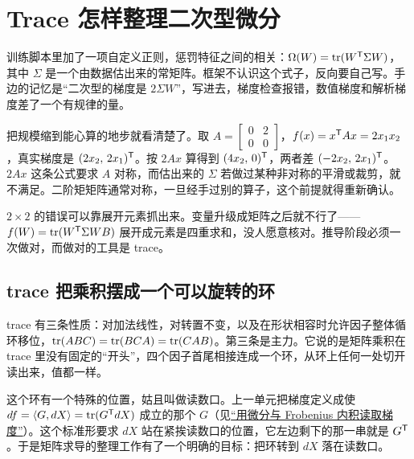 \section{Trace 怎样整理二次型微分}
\label{sec:10-Matrix-Calculus/03-Trace-Calculus/01}

训练脚本里加了一项自定义正则，惩罚特征之间的相关：\(\Omega(W)=\operatorname{tr}(W^{\mathsf{T}}\Sigma W)\)，其中 \(\Sigma\) 是一个由数据估出来的常矩阵。框架不认识这个式子，反向要自己写。手边的记忆是``二次型的梯度是 \(2\Sigma W\)''，写进去，梯度检查报错，数值梯度和解析梯度差了一个有规律的量。

把规模缩到能心算的地步就看清楚了。取 \(A=\begin{bmatrix}0&2\\0&0\end{bmatrix}\)，\(f(x)=x^{\mathsf{T}}Ax=2x_1x_2\)，真实梯度是 \((2x_2,\,2x_1)^{\mathsf{T}}\)。按 \(2Ax\) 算得到 \((4x_2,\,0)^{\mathsf{T}}\)，两者差 \((-2x_2,\,2x_1)^{\mathsf{T}}\)。\(2Ax\) 这条公式要求 \(A\) 对称，而估出来的 \(\Sigma\) 若做过某种非对称的平滑或裁剪，就不满足。二阶矩矩阵通常对称，一旦经手过别的算子，这个前提就得重新确认。

\(2\times2\) 的错误可以靠展开元素抓出来。变量升级成矩阵之后就不行了——\(f(W)=\operatorname{tr}(W^{\mathsf{T}}\Sigma W B)\) 展开成元素是四重求和，没人愿意核对。推导阶段必须一次做对，而做对的工具是 trace。

\subsection{trace 把乘积摆成一个可以旋转的环}

trace 有三条性质：对加法线性，对转置不变，以及在形状相容时允许因子整体循环移位，\(\operatorname{tr}(ABC)=\operatorname{tr}(BCA)=\operatorname{tr}(CAB)\)。第三条是主力。它说的是矩阵乘积在 trace 里没有固定的``开头''，四个因子首尾相接连成一个环，从环上任何一处切开读出来，值都一样。

这个环有一个特殊的位置，姑且叫做读数口。上一单元把梯度定义成使 \(df=\left\langle G,dX\right\rangle=\operatorname{tr}(G^{\mathsf{T}}dX)\) 成立的那个 \(G\)（见\hyperref[sec:10-Matrix-Calculus/02-Differentials/01]{``用微分与 Frobenius 内积读取梯度''}）。这个标准形要求 \(dX\) 站在紧挨读数口的位置，它左边剩下的那一串就是 \(G^{\mathsf{T}}\)。于是矩阵求导的整理工作有了一个明确的目标：把环转到 \(dX\) 落在读数口。

